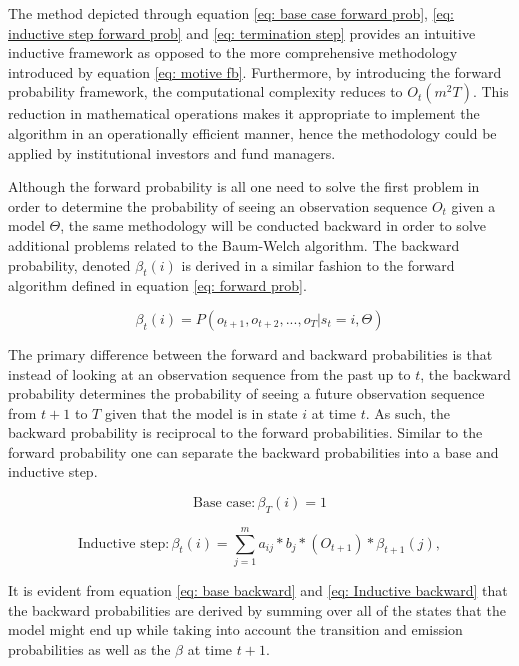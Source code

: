 The method depicted through equation \ref{eq: base case forward prob}, \ref{eq: inductive step forward prob} and \ref{eq: termination step} provides an intuitive inductive framework as opposed to the more comprehensive methodology introduced by equation \ref{eq: motive fb}. Furthermore, by introducing the forward probability framework, the computational complexity reduces to $O_t(m^2T)$. This reduction in mathematical operations makes it appropriate to implement the algorithm in an operationally efficient manner, hence the methodology could be applied by institutional investors and fund managers. 

Although the forward probability is all one need to solve the first problem in order to determine the probability of seeing an observation sequence $O_t$ given a model $\Theta$, the same methodology will be conducted backward in order to solve additional problems related to the Baum-Welch algorithm. The backward probability, denoted $\beta_t(i)$ is derived in a similar fashion to the forward algorithm defined in equation \ref{eq: forward prob}.

\begin{equation}
    \beta_t(i) = P(o_{t+1}, o_{t+2},...,o_T | s_t = i, \Theta) 
\end{equation}

The primary difference between the forward and backward probabilities is that instead of looking at an observation sequence from the past up to $t$, the backward probability determines the probability of seeing a future observation sequence from $t+1$ to $T$ given that the model is in state $i$ at time $t$. As such, the backward probability is reciprocal to the forward probabilities. Similar to the forward probability one can separate the backward probabilities into a base and inductive step. 

\begin{equation}
    \text{Base case}: \beta_T(i) = 1 %
    \label{eq: base backward}
\end{equation}

\begin{equation}
    \text{Inductive step}: \beta_t(i) = \sum_{j=1}^m a_{ij}*b_j*(O_{t+1})*\beta_{t+1}(j), %
    \label{eq: Inductive backward}
\end{equation}

It is evident from equation \ref{eq: base backward} and \ref{eq: Inductive backward} that the backward probabilities are derived by summing over all of the states that the model might end up while taking into account the transition and emission probabilities as well as the $\beta$ at time $t+1$.

